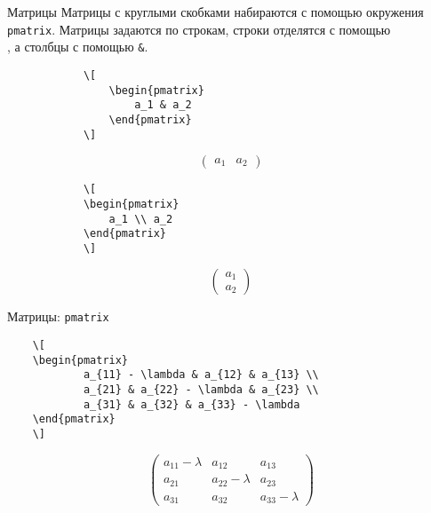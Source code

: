 \begin{frame}[fragile]{Матрицы}
	Матрицы с круглыми скобками набираются с помощью окружения \texttt{pmatrix}. Матрицы задаются по строкам, строки отделятся с помощью \texttt{\\}, а столбцы с помощью \texttt{&}. 
	
	\begin{minipage}{0.59\textwidth}
		\begin{verbatim}
			\[
				\begin{pmatrix}
					a_1 & a_2 
				\end{pmatrix}
			\]
		\end{verbatim}
	\end{minipage}
	\begin{minipage}{0.39\textwidth}
		\begin{center}
			\LARGE
			\[
			\begin{pmatrix}
				a_1 & a_2 
			\end{pmatrix}
			\]
		\end{center}
	\end{minipage}	

	\begin{minipage}{0.59\textwidth}
		\begin{verbatim}
			\[
			\begin{pmatrix}
				a_1 \\ a_2 
			\end{pmatrix}
			\]
		\end{verbatim}
	\end{minipage}
	\begin{minipage}{0.39\textwidth}
		\begin{center}
			\LARGE
			\[
			\begin{pmatrix}
				a_1 \\ a_2 
			\end{pmatrix}
			\]
		\end{center}
	\end{minipage}
\end{frame}

\begin{frame}[fragile]{Матрицы: \texttt{pmatrix}}
	\begin{verbatim}
	\[
	\begin{pmatrix}
			a_{11} - \lambda & a_{12} & a_{13} \\
			a_{21} & a_{22} - \lambda & a_{23} \\
			a_{31} & a_{32} & a_{33} - \lambda
	\end{pmatrix}
	\]
	\end{verbatim}
	\Large
	\[
	\begin{pmatrix}
		a_{11} - \lambda & a_{12} & a_{13} \\
		a_{21} & a_{22} - \lambda & a_{23} \\
		a_{31} & a_{32} & a_{33} - \lambda
	\end{pmatrix}
	\]
\end{frame}


